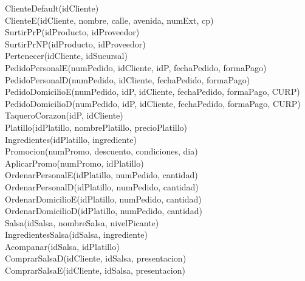 \documentclass[a4paper, 12pt]{report}
\begin{document}
ClienteDefault(idCliente)\\

ClienteE(idCliente, nombre, calle, avenida, numExt, cp)\\

SurtirPrP(idProducto, idProveedor)\\

SurtirPrNP(idProducto, idProveedor)\\

Pertenecer(idCliente, idSucursal)\\

PedidoPersonalE(numPedido, idCliente, idP, fechaPedido, formaPago)\\

PedidoPersonalD(numPedido, idCliente, fechaPedido, formaPago)\\

PedidoDomicilioE(numPedido, idP, idCliente, fechaPedido, formaPago, CURP)\\

PedidoDomicilioD(numPedido, idP, idCliente, fechaPedido, formaPago, CURP)\\

TaqueroCorazon(idP, idCliente)\\

Platillo(idPlatillo, nombrePlatillo, precioPlatillo)\\

Ingredientes(idPlatillo, ingrediente)\\

Promocion(numPromo, descuento, condiciones, dia)\\

AplicarPromo(numPromo, idPlatillo)\\

OrdenarPersonalE(idPlatillo, numPedido, cantidad)\\

OrdenarPersonalD(idPlatillo, numPedido, cantidad)\\

OrdenarDomicilioE(idPlatillo, numPedido, cantidad)\\

OrdenarDomicilioD(idPlatillo, numPedido, cantidad)\\

Salsa(idSalsa, nombreSalsa, nivelPicante)\\

IngredientesSalsa(idSalsa, ingrediente)\\

Acompanar(idSalsa, idPlatillo)\\

ComprarSalsaD(idCliente, idSalsa, presentacion)\\

ComprarSalsaE(idCliente, idSalsa, presentacion)\\
\end{document}
